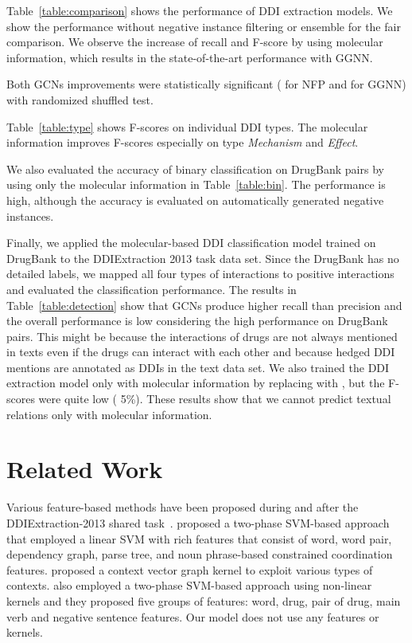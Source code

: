 \documentclass[11pt,a4paper]{article}
\begin{document}
Table~\ref{table:comparison} shows the performance of DDI extraction models. We show the performance without negative instance filtering or ensemble for the fair comparison. We observe the increase of recall and F-score by using molecular information, which results in the state-of-the-art performance with GGNN. 

Both GCNs improvements were statistically significant ( for NFP and  for GGNN) with randomized shuffled test. 


Table~\ref{table:type} shows F-scores on individual DDI types. The molecular information improves F-scores especially on type \textsl{Mechanism} and \textsl{Effect}.

We also evaluated the accuracy of binary classification on DrugBank pairs by using only the molecular information in Table~\ref{table:bin}. 
The performance is high, although the accuracy is evaluated on automatically generated negative instances.

Finally, we applied the molecular-based DDI classification model trained on DrugBank to the DDIExtraction 2013 task data set. 
Since the DrugBank has no detailed labels, we mapped all four types of interactions to positive interactions and evaluated the classification performance. The results in Table~\ref{table:detection} show that GCNs produce higher recall than precision and the overall performance is low considering the high performance on DrugBank pairs. This might be because the interactions of drugs are not always mentioned in texts even if the drugs can interact with each other and because hedged DDI mentions are annotated as DDIs in the text data set. 
We also trained the DDI extraction model only with molecular information by replacing  with , but the F-scores were quite low ( 5\%). These results show that we cannot predict textual relations only with molecular information.


\section{Related Work}

Various feature-based methods have been proposed during and after the DDIExtraction-2013 shared task~\cite{segura2013semeval}.
 proposed a two-phase SVM-based approach that employed a linear SVM with rich features that consist of word, word pair, dependency graph, parse tree, and noun phrase-based constrained coordination features. 
 proposed a context vector graph kernel to exploit various types of contexts. 
 also employed a two-phase SVM-based approach using non-linear kernels and they proposed five groups of features: word, drug, pair of drug, main verb and negative sentence features.
Our model does not use any features or kernels.  
\end{document}
